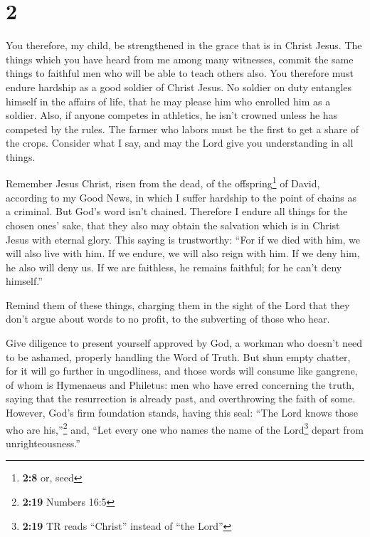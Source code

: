 \hypertarget{section-1}{%
\section{2}\label{section-1}}

 You therefore, my child, be strengthened in the grace
that is in Christ Jesus.  The things which you have heard
from me among many witnesses, commit the same things to faithful men who
will be able to teach others also.  You therefore must
endure hardship as a good soldier of Christ Jesus.  No
soldier on duty entangles himself in the affairs of life, that he may
please him who enrolled him as a soldier.  Also, if anyone
competes in athletics, he isn't crowned unless he has competed by the
rules.  The farmer who labors must be the first to get a
share of the crops.  Consider what I say, and may the Lord
give you understanding in all things.

 Remember Jesus Christ, risen from the dead, of the
offspring\footnote{\textbf{2:8} or, seed} of David, according to my Good
News,  in which I suffer hardship to the point of chains
as a criminal. But God's word isn't chained.  Therefore I
endure all things for the chosen ones' sake, that they also may obtain
the salvation which is in Christ Jesus with eternal glory.
 This saying is trustworthy: ``For if we died with him,
we will also live with him.  If we endure, we will also
reign with him. If we deny him, he also will deny us.  If
we are faithless, he remains faithful; for he can't deny himself.''

 Remind them of these things, charging them in the sight
of the Lord that they don't argue about words to no profit, to the
subverting of those who hear.

 Give diligence to present yourself approved by God, a
workman who doesn't need to be ashamed, properly handling the Word of
Truth.  But shun empty chatter, for it will go further in
ungodliness,  and those words will consume like gangrene,
of whom is Hymenaeus and Philetus:  men who have erred
concerning the truth, saying that the resurrection is already past, and
overthrowing the faith of some.  However, God's firm
foundation stands, having this seal: ``The Lord knows those who are
his,''\footnote{\textbf{2:19} Numbers 16:5} and, ``Let every one who
names the name of the Lord\footnote{\textbf{2:19} TR reads ``Christ''
  instead of ``the Lord''} depart from unrighteousness.''

